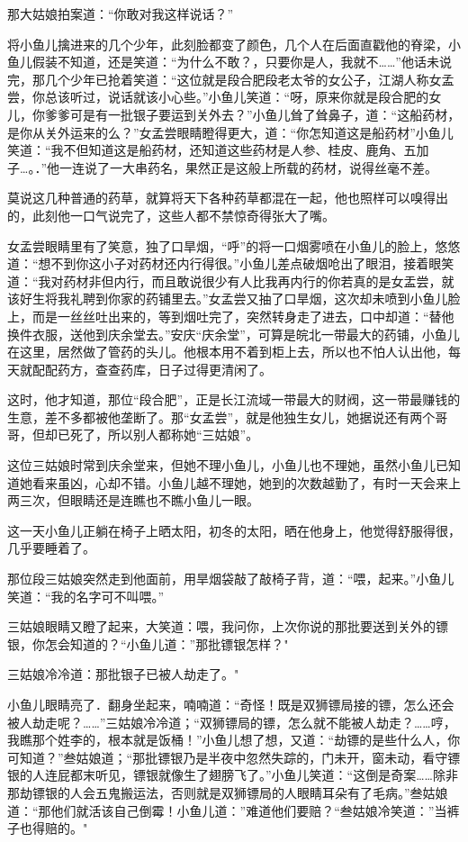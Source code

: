 \documentclass[12pt,oneside]{book}
\begin{document}
那大姑娘拍案道：``你敢对我这样说话？''

将小鱼儿擒进来的几个少年，此刻脸都变了颜色，几个人在后面直戳他的脊梁，小鱼儿假装不知道，还是笑道：``为什么不敢？，只要你是人，我就不\ldots\ldots{}''他话未说完，那几个少年已抢着笑道：``这位就是段合肥段老太爷的女公子，江湖人称女孟尝，你总该听过，说话就该小心些。''小鱼儿笑道：``呀，原来你就是段合肥的女儿，你爹爹可是有一批银子要运到关外去？''小鱼儿耸了耸鼻子，道：``这船药材，是你从关外运来的么？''女孟尝眼睛瞪得更大，道：``你怎知道这是船药材''小鱼儿笑道：``我不但知道这是船药材，还知道这些药材是人参、桂皮、鹿角、五加子\ldots。．''他一连说了一大串药名，果然正是这般上所载的药材，说得丝毫不差。

莫说这几种普通的药草，就算将天下各种药草都混在一起，他也照样可以嗅得出的，此刻他一口气说完了，这些人都不禁惊奇得张大了嘴。

女孟尝眼睛里有了笑意，独了口旱烟，``呼''的将一口烟雾喷在小鱼儿的脸上，悠悠道：``想不到你这小子对药材还内行得很。''小鱼儿差点破烟呛出了眼泪，接着眼笑道：``我对药材非但内行，而且敢说很少有人比我再内行的你若真的是女盂尝，就该好生将我礼聘到你家的药铺里去。''女孟尝又抽了口旱烟，这次却未喷到小鱼儿脸上，而是一丝丝吐出来的，等到烟吐完了，突然转身走了进去，口中却道：``替他换件衣服，送他到庆余堂去。''安庆``庆余堂''，可算是皖北一带最大的药铺，小鱼儿在这里，居然做了管药的头儿。他根本用不着到柜上去，所以也不怕人认出他，每天就配配药方，查查药库，日子过得更清闲了。

这时，他才知道，那位``段合肥''，正是长江流域一带最大的财阀，这一带最赚钱的生意，差不多都被他垄断了。那``女孟尝''，就是他独生女儿，她据说还有两个哥哥，但却已死了，所以别人都称她``三姑娘''。

这位三姑娘时常到庆余堂来，但她不理小鱼儿，小鱼儿也不理她，虽然小鱼儿已知道她看来虽凶，心却不错。小鱼儿越不理她，她到的次数越勤了，有时一天会来上两三次，但眼睛还是连瞧也不瞧小鱼儿一眼。

这一天小鱼儿正躺在椅子上晒太阳，初冬的太阳，晒在他身上，他觉得舒服得很，几乎要睡着了。

那位段三姑娘突然走到他面前，用旱烟袋敲了敲椅子背，道：``喂，起来。''小鱼儿笑道：``我的名字可不叫喂。''

三姑娘眼睛又瞪了起来，大笑道：喂，我问你，上次你说的那批要送到关外的镖银，你怎会知道的？``小鱼儿道：''那批镖银怎样？"

三姑娘冷冷道：那批银子已被人劫走了。"

小鱼儿眼睛亮了．翻身坐起来，喃喃道：``奇怪！既是双狮镖局接的镖，怎么还会被人劫走呢？\ldots\ldots{}''三姑娘冷冷道；``双狮镖局的镖，怎么就不能被人劫走？\ldots\ldots 哼，我瞧那个姓李的，根本就是饭桶！''小鱼儿想了想，又道：``劫镖的是些什么人，你可知道？''叁姑娘道；``那批镖银乃是半夜中忽然失踪的，门未开，窗未动，看守镖银的人连屁都末听见，镖银就像生了翅膀飞了。''小鱼儿笑道：``这倒是奇案\ldots\ldots 除非那劫镖银的人会五鬼搬运法，否则就是双狮镖局的人眼睛耳朵有了毛病。''叁姑娘道：``那他们就活该自己倒霉！小鱼儿道：''难道他们要赔？``叁姑娘冷笑道：''当裤子也得赔的。"
\end{document}

